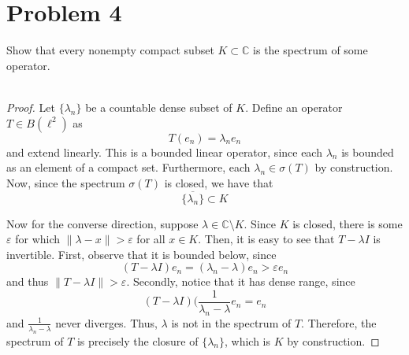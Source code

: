 \documentclass[fontsize=11pt]{scrartcl} %
\numberwithin{equation}{section} %
\numberwithin{figure}{section} %
\numberwithin{table}{section} %
\newcommand{\C}{\mathbb{C}}
\begin{document}
\section*{Problem 4}
Show that every nonempty compact subset $K\subset\C$ is the spectrum of some
operator.
\\
\\
\begin{proof}
    Let $\{\lambda_n\}$ be a countable dense subset of $K$. Define an operator
    $T\in B(\ell^2)$ as
    \[
        T(e_n) = \lambda_ne_n
    \]
    and extend linearly. This is a bounded linear operator, since each
    $\lambda_n$ is bounded as an element of a compact set. Furthermore, each
    $\lambda_n\in\sigma(T)$ by construction. Now, since the spectrum $\sigma(T)$
    is closed, we have that
    \[
        \overline{\{\lambda_n\}} \subset K
    \]

    Now for the converse direction, suppose $\lambda\in \C\setminus K$. Since
    $K$ is closed, there is some $\varepsilon$ for which $\|\lambda - x\| >
    \varepsilon$ for all $x\in K$. Then, it is easy to see that $T-\lambda I$ is
    invertible. First, observe that it is bounded below, since
    \[
        (T-\lambda I)e_n = (\lambda_n-\lambda)e_n > \varepsilon e_n
    \]
    and thus $\|T-\lambda I\| > \varepsilon$. Secondly, notice that it has dense
    range, since
    \[
        (T-\lambda I)(\frac{1}{\lambda_n-\lambda}e_n = e_n
    \]
    and $\frac{1}{\lambda_n - \lambda}$ never diverges. Thus, $\lambda$ is not
    in the spectrum of $T$. Therefore, the spectrum of $T$ is precisely the
    closure of $\{\lambda_n\}$, which is $K$ by construction.
\end{proof}

\newpage
\end{document}

